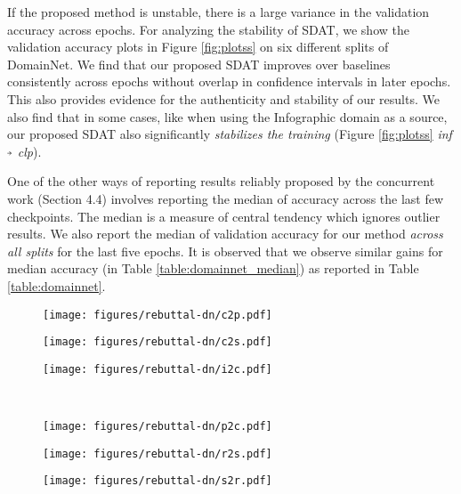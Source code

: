 \documentclass[table,dvipsnames]{article}
\newcommand{\veryshortarrow}[1][3pt]{\mathrel{\hbox{\rule[\dimexpr\fontdimen22\textfont2-.2pt\relax]{#1}{.4pt}}\mkern-4mu\hbox{\usefont{U}{lasy}{m}{n}\symbol{41}}}} \newcommand{\cmark}{\ding{51}}\newcommand{\xmark}{\ding{55}}\usepackage{amssymb}\usepackage{pifont}\usepackage[hyphens]{url}
\theoremstyle{plain}
\theoremstyle{definition}
\theoremstyle{remark}
\begin{document}
If the proposed method is unstable, there is a large variance in the validation accuracy across epochs. For analyzing the stability of SDAT, we show the validation accuracy plots in Figure \ref{fig:plotss}  on six different splits of DomainNet. We find that our proposed SDAT improves over baselines consistently across epochs without overlap in confidence intervals in later epochs. This also provides evidence for the authenticity and stability of our results.  We also find that in some cases, like when using the Infographic domain as a source, our proposed SDAT also significantly \textit{stabilizes the training} (Figure \ref{fig:plotss} \textit{inf} $\veryshortarrow$ \textit{clp}).

One of the other ways of reporting results reliably proposed by the concurrent work \citep{berthelot2021adamatch} (Section 4.4) involves reporting the median of accuracy across the last few checkpoints. The median is a measure of central tendency which ignores outlier results. We also report the median of validation accuracy for our method \emph{across all splits} for the last five epochs. It is observed that we observe similar gains for median accuracy (in Table \ref{table:domainnet_median}) as reported in Table \ref{table:domainnet}.
\begin{figure*}[t!]
    \centering
    \begin{subfigure}[b]{0.3\linewidth}
  \centering
  \texttt{[image: figures/rebuttal-dn/c2p.pdf]}
  \label{fig:c2p}
\end{subfigure}
\begin{subfigure}[b]{0.3\linewidth}
  \centering
  \texttt{[image: figures/rebuttal-dn/c2s.pdf]}
  \label{fig:c2s}
\end{subfigure}
\begin{subfigure}[b]{0.3\linewidth}
  \centering
  \texttt{[image: figures/rebuttal-dn/i2c.pdf]}
  \label{fig:i2c}
\end{subfigure}\\
    \begin{subfigure}[b]{0.3\linewidth}
  \centering
  \texttt{[image: figures/rebuttal-dn/p2c.pdf]}
  \label{fig:p2c}
\end{subfigure}
\begin{subfigure}[b]{0.3\linewidth}
  \centering
  \texttt{[image: figures/rebuttal-dn/r2s.pdf]}
  \label{fig:r2s}
\end{subfigure}
\begin{subfigure}[b]{0.3\linewidth}
  \centering
  \texttt{[image: figures/rebuttal-dn/s2r.pdf]}
  \label{fig:s2r}
\end{subfigure}
\caption{{Validation Accuracy across epochs on different splits of DomainNet. We run on three different random seeds and plot the error bar indicating standard deviation across runs. CDAN w/ SDAT consistently outperforms CDAN across different splits of DomainNet.}}
\label{fig:plotss}

\end{figure*}
\end{document}

